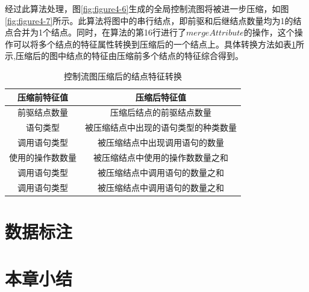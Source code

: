 经过此算法处理，图\ref{fig:figure4-6}生成的全局控制流图将被进一步压缩，如图\ref{fig:figure4-7}所示。此算法将图中的串行结点，即前驱和后继结点数量均为1的结点合并为1个结点。同时，在算法的第16行进行了$mergeAttribute$的操作，这个操作可以将多个结点的特征属性转换到压缩后的一个结点上。具体转换方法如表\ref{tab:table4-6}所示,压缩后的图中结点的特征由压缩前多个结点的特征综合得到。

\begin{table}[hb]
	\centering
	\caption{控制流图压缩后的结点特征转换} \label{tab:table4-6}
	\begin{tabular*}{0.9\textwidth}{@{\extracolsep{\fill}}cc}
		\toprule
		压缩前特征值	&压缩后特征值	 \\
		\midrule
		前驱结点数量 & 压缩后结点的前驱结点数量	\\
		语句类型 & 被压缩结点中出现的语句类型的种类数量	 \\
		调用语句类型 & 被压缩结点中出现调用语句的数量 \\
		使用的操作数数量 & 被压缩结点中使用的操作数数量之和 \\
		调用语句类型 & 被压缩结点中调用语句的数量之和 \\
		调用语句类型 & 被压缩结点中调用语句的数量之和 \\
		\bottomrule
	\end{tabular*}
\end{table}

\section{数据标注}

\section{本章小结}